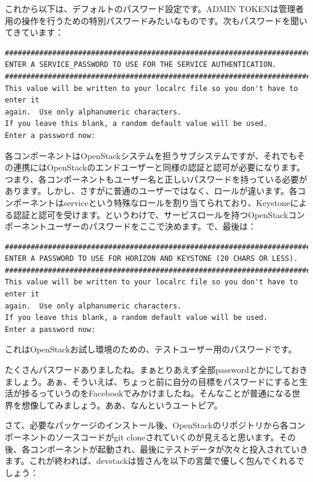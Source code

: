 \documentclass[8pt,b5paper,tombo,openany]{jsbook}
\begin{document}
これから以下は、デフォルトのパスワード設定です。ADMIN TOKENは管理者用の操作を行うための特別パスワードみたいなものです。次もパスワードを聞いてきています：

\begin{lstlisting}
################################################################################
ENTER A SERVICE_PASSWORD TO USE FOR THE SERVICE AUTHENTICATION.
################################################################################
This value will be written to your localrc file so you don't have to enter it
again.  Use only alphanumeric characters.
If you leave this blank, a random default value will be used.
Enter a password now:
\end{lstlisting}

各コンポーネントはOpenStackシステムを担うサブシステムですが、それでもその連携にはOpenStackのエンドユーザーと同様の認証と認可が必要になります。つまり、各コンポーネントもユーザー名と正しいパスワードを持っている必要があります。しかし、さすがに普通のユーザーではなく、ロールが違います。各コンポーネントはserviceという特殊なロールを割り当てられており、Keystoneによる認証と認可を受けます。というわけで、サービスロールを持つOpenStackコンポーネントユーザーのパスワードをここで決めます。で、最後は：

\begin{lstlisting}
################################################################################
ENTER A PASSWORD TO USE FOR HORIZON AND KEYSTONE (20 CHARS OR LESS).
################################################################################
This value will be written to your localrc file so you don't have to enter it
again.  Use only alphanumeric characters.
If you leave this blank, a random default value will be used.
Enter a password now:
\end{lstlisting}

これはOpenStackお試し環境のための、テストユーザー用のパスワードです。

たくさんパスワードありましたね。まぁとりあえず全部passwordとかにしておきましょう。あぁ、そういえば、ちょっと前に自分の目標をパスワードにすると生活が捗るっていうのをFacebookでみかけましたね。そんなことが普通になる世界を想像してみましょう。ああ、なんというユートピア。

さて、必要なパッケージのインストール後、OpenStackのリポジトリから各コンポーネントのソースコードがgit cloneされていくのが見えると思います。その後、各コンポーネントが起動され、最後にテストデータが次々と投入されていきます。これが終われば、devstackは皆さんを以下の言葉で優しく包んでくれるでしょう：
\end{document}
